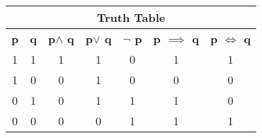 \begin{table}[h!]
\centering
\begin{tabular}{|c|c|c|c|c|c|c|}
\hline
\multicolumn{7}{|c|}{Truth Table}\\
\hline
\textbf{p} & \textbf{q} & \textbf{p$\land$ q} & \textbf{p$\lor$ q} & \textbf{$\neg$ p} & \textbf{p $\implies$ q} & \textbf{p $\iff$ q} \\ \hline
1          & 1          & 1                   & 1                  & 0                 & 1                       & 1                   \\ \hline
1          & 0          & 0                   & 1                  & 0                 & 0                       & 0                   \\ \hline
0          & 1          & 0                   & 1                  & 1                 & 1                       & 0                   \\ \hline
0          & 0          & 0                   & 0                  & 1                 & 1                       & 1                   \\ \hline
\end{tabular}
\end{table}